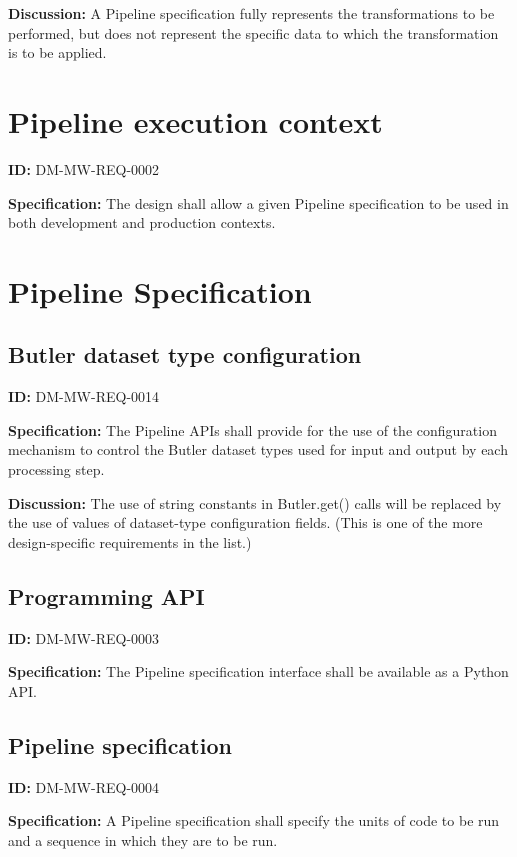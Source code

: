 \documentclass[SE,toc,lsstdraft]{lsstdoc}
\begin{document}
\textbf{Discussion:}
A Pipeline specification fully represents the transformations to be performed, but does not represent the specific data to which the transformation is to be applied.

\section{Pipeline execution context}

\label{DM-MW-REQ-0002}
\textbf{ID:} DM-MW-REQ-0002

\textbf{Specification:}
The design shall allow a given Pipeline specification to be used in both development and production contexts.

\section{Pipeline Specification}

\subsection{Butler dataset type configuration}

\label{DM-MW-REQ-0014}
\textbf{ID:} DM-MW-REQ-0014

\textbf{Specification:}
The Pipeline APIs shall provide for the use of the configuration mechanism to control the Butler dataset types used for input and output by each processing step.

\textbf{Discussion:}
The use of string constants in Butler.get() calls will be replaced by the use of values of dataset-type configuration fields. (This is one of the more design-specific requirements in the list.)

\subsection{Programming API}

\label{DM-MW-REQ-0003}
\textbf{ID:} DM-MW-REQ-0003

\textbf{Specification:}
The Pipeline specification interface shall be available as a Python API.

\subsection{Pipeline specification}

\label{DM-MW-REQ-0004}
\textbf{ID:} DM-MW-REQ-0004

\textbf{Specification:}
A Pipeline specification shall specify the units of code to be run and a sequence in which they are to be run.
\end{document}

